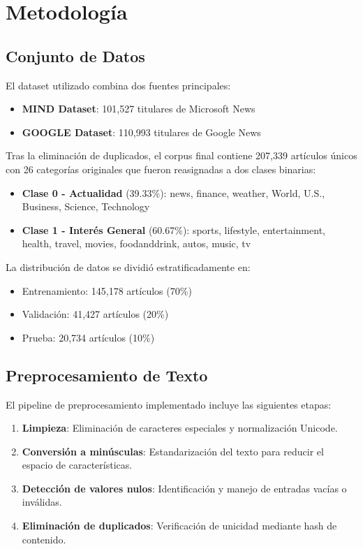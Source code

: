 \documentclass[12pt,a4paper]{article}
\begin{document}
\section{Metodología}

\subsection{Conjunto de Datos}

El dataset utilizado combina dos fuentes principales:

\begin{itemize}
    \item \textbf{MIND Dataset}: 101,527 titulares de Microsoft News
    \item \textbf{GOOGLE Dataset}: 110,993 titulares de Google News
\end{itemize}

Tras la eliminación de duplicados, el corpus final contiene 207,339 artículos únicos con 26 categorías originales que fueron reasignadas a dos clases binarias:

\begin{itemize}
    \item \textbf{Clase 0 - Actualidad} (39.33\%): news, finance, weather, World, U.S., Business, Science, Technology
    \item \textbf{Clase 1 - Interés General} (60.67\%): sports, lifestyle, entertainment, health, travel, movies, foodanddrink, autos, music, tv
\end{itemize}

La distribución de datos se dividió estratificadamente en:
\begin{itemize}
    \item Entrenamiento: 145,178 artículos (70\%)
    \item Validación: 41,427 artículos (20\%)
    \item Prueba: 20,734 artículos (10\%)
\end{itemize}

\subsection{Preprocesamiento de Texto}

El pipeline de preprocesamiento implementado incluye las siguientes etapas:

\begin{enumerate}
    \item \textbf{Limpieza}: Eliminación de caracteres especiales y normalización Unicode.
    \item \textbf{Conversión a minúsculas}: Estandarización del texto para reducir el espacio de características.
    \item \textbf{Detección de valores nulos}: Identificación y manejo de entradas vacías o inválidas.
    \item \textbf{Eliminación de duplicados}: Verificación de unicidad mediante hash de contenido.
\end{enumerate}
\end{document}
